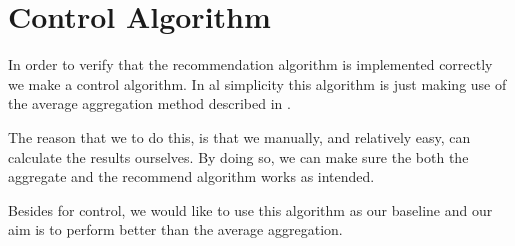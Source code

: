 \section{Control Algorithm}

In order to verify that the recommendation algorithm is implemented correctly we make a control algorithm. In al simplicity this algorithm is just making use of the average aggregation method described in . 

The reason that we to do this, is that we manually, and relatively easy, can calculate the results ourselves. By doing so, we can make sure the both the aggregate and the recommend algorithm works as intended. 

Besides for control, we would like to use this algorithm as our baseline and our aim is to perform better than the average aggregation.